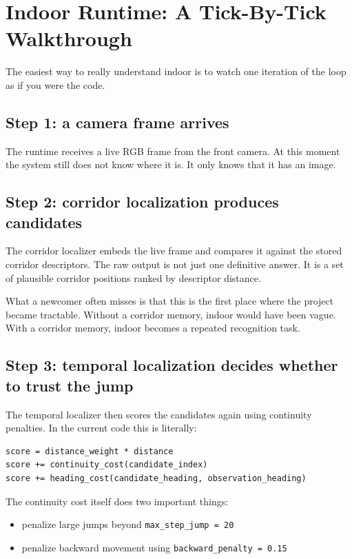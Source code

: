 \documentclass[11pt]{article}
\begin{document}
\section{Indoor Runtime: A Tick-By-Tick Walkthrough}

The easiest way to really understand indoor is to watch one iteration of the loop as
if you were the code.

\subsection{Step 1: a camera frame arrives}

The runtime receives a live RGB frame from the front camera. At this moment the
system still does not know where it is. It only knows that it has an image.

\subsection{Step 2: corridor localization produces candidates}

The corridor localizer embeds the live frame and compares it against the stored
corridor descriptors. The raw output is not just one definitive answer. It is a set
of plausible corridor positions ranked by descriptor distance.

What a newcomer often misses is that this is the first place where the project
became tractable. Without a corridor memory, indoor would have been vague. With a
corridor memory, indoor becomes a repeated recognition task.

\subsection{Step 3: temporal localization decides whether to trust the jump}

The temporal localizer then scores the candidates again using continuity penalties.
In the current code this is literally:

\begin{lstlisting}
score = distance_weight * distance
score += continuity_cost(candidate_index)
score += heading_cost(candidate_heading, observation_heading)
\end{lstlisting}

The continuity cost itself does two important things:

\begin{itemize}[nosep]
  \item penalize large jumps beyond \texttt{max\_step\_jump = 20}
  \item penalize backward movement using \texttt{backward\_penalty = 0.15}
\end{itemize}
\end{document}
